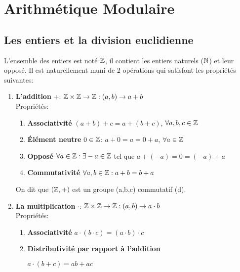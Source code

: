 
\section{Arithmétique Modulaire}

\subsection{Les entiers et la division euclidienne}

L'ensemble des entiers est noté $\mathbb{Z}$, il contient les entiers naturels ($\mathbb{N}$) et leur opposé. Il est naturellement muni de 2 opérations qui satisfont les propriétés suivantes:

\begin{enumerate}
\item \textbf{L'addition} +: $\mathbb{Z} \times \mathbb{Z} \rightarrow \mathbb{Z} : (a,b) \rightarrow a+b $\\
Propriétés: 
	\begin{enumerate}
		\item \textbf{Associativité} $(a+b)+c = a+(b+c)$, $\forall a,b,c \in \mathbb{Z}$
		\item \textbf{Élément neutre} $0 \in \mathbb{Z}$: $a+0=a=0+a$, $\forall a \in \mathbb{Z}$
		\item \textbf{Opposé} $\forall a \in \mathbb{Z}: \exists -a \in \mathbb{Z}$ tel que $a+(-a) =0=(-a)+a$
		\item \textbf{Commutativité} $\forall a,b \in \mathbb{Z}: a+b = b+a$	\\
	\end{enumerate}
On dit que $(\mathbb{Z},+)$ est un groupe (a,b,c) commutatif (d).\\

\item \textbf{La multiplication} $\cdot$: $\mathbb{Z} \times \mathbb{Z} \rightarrow \mathbb{Z} : (a,b) \rightarrow a \cdot b$ \\
Propriétés:
	\begin{enumerate}
		\item \textbf{Associativité} $a\cdot(b\cdot c)=(a\cdot b)\cdot c$
		\item \textbf{Distributivité par rapport à l'addition} \\
			\begin{minipage}{.2\textwidth}
				\hspace{0.5cm}$a\cdot (b+c) = ab + ac$\\


\end{minipage}
\end{enumerate}
\end{enumerate}

